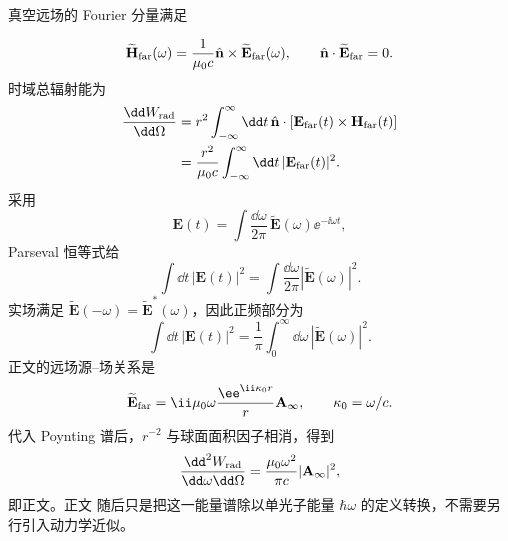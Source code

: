 \begin{derivation}[远场振幅与辐射能谱]
真空远场的 Fourier 分量满足

\begin{equation*}
 \widetilde{\mathbf H}_{\rm far}(\omega)
 =\frac1{\mu_0c}\hat{\mathbf n}\times
 \widetilde{\mathbf E}_{\rm far}(\omega),
 \qquad
 \hat{\mathbf n}\cdot\widetilde{\mathbf E}_{\rm far}=0.
\end{equation*}
时域总辐射能为
\begin{align*}
 \frac{\dd W_{\rm rad}}{\dd\Omega}
 &=r^2\int_{-\infty}^{\infty}\dd t\,
 \hat{\mathbf n}\cdot
 [\mathbf E_{\rm far}(t)\times\mathbf H_{\rm far}(t)]\\
 &=\frac{r^2}{\mu_0c}
 \int_{-\infty}^{\infty}\dd t\,|\mathbf E_{\rm far}(t)|^2.
\end{align*}
采用
\begin{equation*}
 \mathbf E(t)=\int\frac{\dd\omega}{2\pi}\,
 \widetilde{\mathbf E}(\omega)\ee^{-\ii\omega t},
\end{equation*}
Parseval 恒等式给
\begin{equation*}
 \int\dd t\,|\mathbf E(t)|^2
 =\int\frac{\dd\omega}{2\pi}|\widetilde{\mathbf E}(\omega)|^2.
\end{equation*}
实场满足 $\widetilde{\mathbf E}(-\omega)=\widetilde{\mathbf E}^{*}(\omega)$，因此正频部分为
\begin{equation*}
 \int\dd t\,|\mathbf E(t)|^2
 =\frac1\pi\int_0^\infty\dd\omega\,
 |\widetilde{\mathbf E}(\omega)|^2.
\end{equation*}
正文的远场源--场关系是
\begin{equation*}
 \widetilde{\mathbf E}_{\rm far}
 =\ii\mu_0\omega\frac{\ee^{\ii\kappa_0r}}{r}
 \mathbf A_\infty,
 \qquad \kappa_0=\omega/c.
\end{equation*}
代入 Poynting 谱后，$r^{-2}$ 与球面面积因子相消，得到
\begin{equation*}
 \frac{\dd^2 W_{\rm rad}}{\dd\omega\dd\Omega}
 =\frac{\mu_0\omega^2}{\pi c}|\mathbf A_\infty|^2,
\end{equation*}
即正文。正文 随后只是把这一能量谱除以单光子能量 $\hbar\omega$ 的定义转换，不需要另行引入动力学近似。
\end{derivation}

